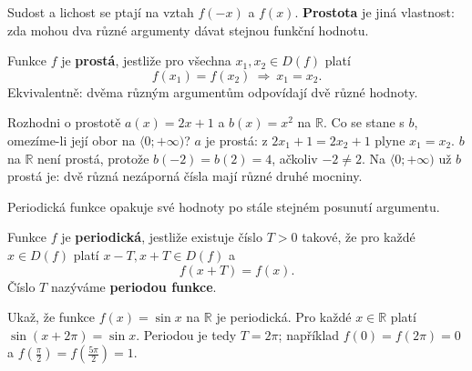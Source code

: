 \documentclass[11pt,a4paper]{article}
\begin{document}

Sudost a lichost se ptají na vztah $f(-x)$ a $f(x)$.
\textbf{Prostota} je jiná vlastnost: zda mohou dva různé
argumenty dávat stejnou funkční hodnotu.

\begin{definiceBox}[title={Definice - Prostá funkce}]
Funkce $f$ je \textbf{prostá}, jestliže pro všechna
$x_1,x_2\in D(f)$ platí
\[
f(x_1)=f(x_2)\ \Longrightarrow\ x_1=x_2.
\]
Ekvivalentně: dvěma různým argumentům odpovídají dvě různé hodnoty.
\end{definiceBox}

\begin{prikladReseniBox}[title={Příklad 3}]
Rozhodni o prostotě $a(x)=2x+1$ a $b(x)=x^2$ na $\mathbb R$.
Co se stane s $b$, omezíme-li její obor na $\langle0;+\infty)$?
\tcblower
$a$ je prostá: z $2x_1+1=2x_2+1$ plyne $x_1=x_2$.
$b$ na $\mathbb R$ není prostá, protože $b(-2)=b(2)=4$,
ačkoliv $-2\ne2$.
Na $\langle0;+\infty)$ už $b$ prostá je:
dvě různá nezáporná čísla mají různé druhé mocniny.
\end{prikladReseniBox}


Periodická funkce opakuje své hodnoty po stále stejném posunutí argumentu.

\begin{definiceBox}[title={Definice - Periodická funkce}]
Funkce $f$ je \textbf{periodická}, jestliže existuje číslo $T>0$
takové, že pro každé $x\in D(f)$ platí $x-T,x+T\in D(f)$ a
\[
f(x+T)=f(x).
\]
Číslo $T$ nazýváme \textbf{periodou funkce}.
\end{definiceBox}

\begin{prikladReseniBox}[title={Příklad 4}]
Ukaž, že funkce $f(x)=\sin x$ na $\mathbb R$ je periodická.
\tcblower
Pro každé $x\in\mathbb R$ platí $\sin(x+2\pi)=\sin x$.
Periodou je tedy $T=2\pi$; například
$f(0)=f(2\pi)=0$ a $f(\frac\pi2)=f(\frac{5\pi}2)=1$.
\end{prikladReseniBox}
\end{document}
